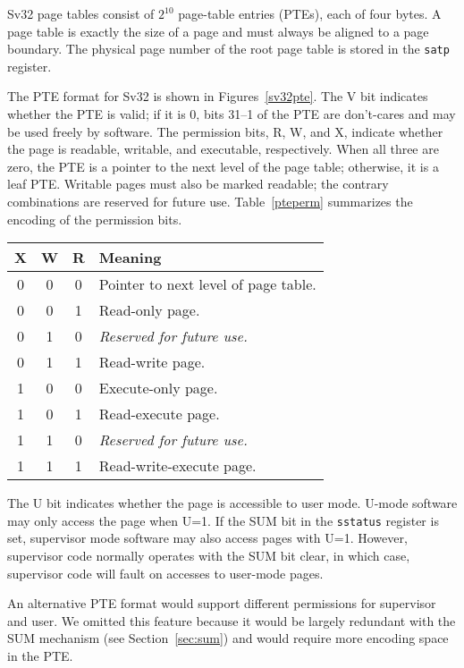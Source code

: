 Sv32 page tables consist of $2^{10}$ page-table entries (PTEs), each
of four bytes.  A page table is exactly the size of a page and must
always be aligned to a page boundary.  The physical page number of the
root page table is stored in the {\tt satp} register.

The PTE format for Sv32 is shown in Figures~\ref{sv32pte}.  The V bit
indicates whether the PTE is valid; if it is 0, bits 31--1 of the PTE are
don't-cares and may be used freely by software.  The permission bits, R, W,
and X, indicate whether the page is readable, writable, and executable,
respectively.  When all three are zero, the PTE is a pointer to the next level
of the page table; otherwise, it is a leaf PTE.  Writable pages must also be
marked readable; the contrary combinations are reserved for future use.
Table~\ref{pteperm} summarizes the encoding of the permission bits.

\begin{table*}[h!]
\begin{center}
\begin{tabular}{|c|c|c||l|}
\hline
X & W & R & Meaning \\
\hline
0 & 0 & 0 & Pointer to next level of page table. \\
0 & 0 & 1 & Read-only page. \\
0 & 1 & 0 & {\em Reserved for future use.} \\
0 & 1 & 1 & Read-write page. \\
1 & 0 & 0 & Execute-only page. \\
1 & 0 & 1 & Read-execute page. \\
1 & 1 & 0 & {\em Reserved for future use.} \\
1 & 1 & 1 & Read-write-execute page. \\
\hline
\end{tabular}
\end{center}
\caption{Encoding of PTE R/W/X fields.}
\label{pteperm}
\end{table*}

The U bit indicates whether the page is accessible to user mode.
U-mode software may only access the page when U=1.  If the SUM bit
in the {\tt sstatus} register is
set, supervisor mode software may also access pages with U=1.
However, supervisor code normally operates with the SUM bit clear, in
which case, supervisor code will fault on accesses to user-mode pages.

\begin{commentary}
An alternative PTE format would support different permissions for supervisor
and user.  We omitted this feature because it would be largely redundant with
the SUM mechanism (see Section~\ref{sec:sum}) and would require more encoding
space in the PTE.
\end{commentary}

